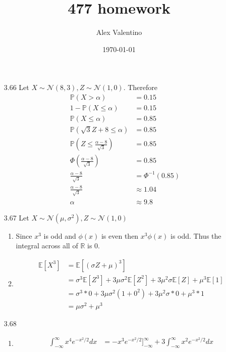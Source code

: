 \documentclass[12pt, letterpaper]{article}
\date{\today}
\author{Alex Valentino}
\title{477 homework}
\newcommand{\R}{\mathbb{R}}
\newcommand{\Pro}{\mathbb{P}}
\newcommand{\E}{\mathbb{E}}
\begin{document}
\begin{enumerate}
	\item[3.66] Let $X \sim \mathcal{N}(8,3), Z\sim \mathcal{N}(1,0)$.  Therefore 
	\begin{align*}
		\Pro(X> \alpha) &= 0.15\\
		1 - \Pro(X \leq \alpha) &= 0.15\\
		\Pro(X \leq \alpha) &= 0.85\\
		\Pro(\sqrt{3}Z + 8 \leq \alpha) &= 0.85\\
		\Pro(Z \leq \frac{\alpha - 8}{\sqrt{3}}) &= 0.85\\
		\Phi(\frac{\alpha - 8}{\sqrt{3}}) &= 0.85\\
		\frac{\alpha - 8}{\sqrt{3}} &= \Phi^{-1}(0.85)\\
		\frac{\alpha - 8}{\sqrt{3}} &\approx 1.04\\
		\alpha &\approx 9.8
	\end{align*}
	\item[3.67] Let $X \sim \mathcal{N}(\mu,\sigma^2), Z \sim \mathcal{N}(1,0)$
		\begin{enumerate}
			\item Since $x^3$ is odd and $\phi(x)$ is even then $x^3 \phi(x)$ is odd.  Thus the integral across all of $\R$ is 0.  
			\iffalse \begin{align*}
				\E[Z^3] &= \int_{-\infty}^\infty x^3 e^{\frac{x^2}{2}}dx\\
				& \text{let } u=x^2, du = 2xdx\\
				&= \frac{1}{2}\int_{\infty}^\infty u e^{-u/2}du\\
				&= 0
			\end{align*} \fi
			\item \begin{align*}
				\E[X^3] &= \E[(\sigma Z + \mu)^3]\\
				&= \sigma^3 \E[Z^3] + 3\mu \sigma^2 \E[Z^2] + 3\mu^2 \sigma \E[Z] + \mu^3\E[1]\\
				&= \sigma^3 * 0 + 3\mu \sigma^2 (1 + 0^2) + 3\mu^2 \sigma * 0 + \mu^3 * 1\\
				&= \mu \sigma^2 + \mu^3
			\end{align*}
		\end{enumerate}
	\item[3.68]
	\begin{enumerate}
		\item \begin{align*}
			\int_{-\infty}^\infty x^4 e^{-x^2/2}dx &= -x^3e^{-x^2/2}]_{-\infty}^\infty + 3\int_{-\infty}^\infty x^2e^{-x^2/2}dx\\

\end{align*}
\end{enumerate}
\end{enumerate}
\end{document}
